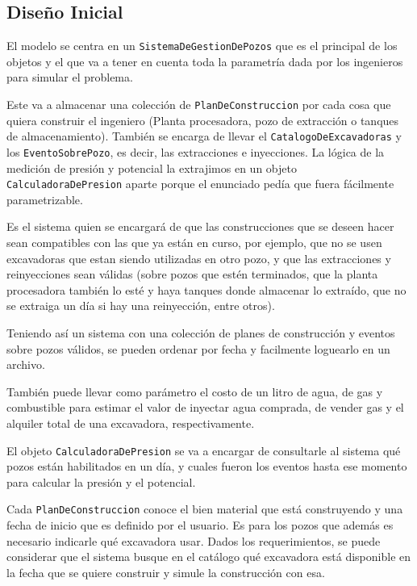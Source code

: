 \subsection{Diseño Inicial}
El modelo se centra en un \texttt{SistemaDeGestionDePozos} que es el principal de los objetos y el que va a tener en cuenta toda la parametr\'ia dada por los ingenieros para simular el problema.

Este va a almacenar una colecci\'on de \texttt{PlanDeConstruccion} por cada cosa que quiera construir el ingeniero (Planta procesadora, pozo de extracci\'on o tanques de almacenamiento). Tambi\'en se encarga de llevar el \texttt{CatalogoDeExcavadoras} y los \texttt{EventoSobrePozo}, es decir, las extracciones e inyecciones. La l\'ogica de la medici\'on de presi\'on y potencial la extrajimos en un objeto \texttt{CalculadoraDePresion} aparte porque el enunciado ped\'ia que fuera f\'acilmente parametrizable.

Es el sistema quien se encargar\'a de que las construcciones que se deseen hacer sean compatibles con las que ya est\'an en curso, por ejemplo, que no se usen excavadoras que estan siendo utilizadas en otro pozo, y que las extracciones y reinyecciones sean v\'alidas (sobre pozos que est\'en terminados, que la planta procesadora tambi\'en lo est\'e y haya tanques donde almacenar lo extra\'ido, que no se extraiga un d\'ia si hay una reinyecci\'on, entre otros).

Teniendo as\'i un sistema con una colecci\'on de planes de construcci\'on y eventos sobre pozos v\'alidos, se pueden ordenar por fecha y facilmente loguearlo en un archivo.

Tambi\'en puede llevar como par\'ametro el costo de un litro de agua, de gas y combustible para estimar el valor de inyectar agua comprada, de vender gas y el alquiler total de una excavadora, respectivamente.

El objeto \texttt{CalculadoraDePresion} se va a encargar de consultarle al sistema qu\'e pozos est\'an habilitados en un d\'ia, y cuales fueron los eventos hasta ese momento para calcular la presi\'on y el potencial.

Cada \texttt{PlanDeConstruccion} conoce el bien material que est\'a construyendo y una fecha de inicio que es definido por el usuario. Es para los pozos que adem\'as es necesario indicarle qu\'e excavadora usar. Dados los requerimientos, se puede considerar que el sistema busque en el cat\'alogo qu\'e excavadora est\'a disponible en la fecha que se quiere construir y simule la construcci\'on con esa.

